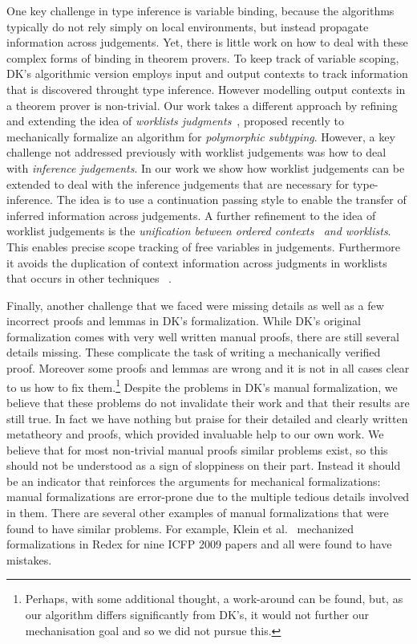 One key challenge in type inference is variable binding, because the
algorithms typically do not rely simply on local environments, but
instead propagate information across judgements.  Yet, there is little
work on how to deal with these complex forms of binding in theorem
provers. To keep track of variable scoping, DK's algorithmic version
employs input and output contexts to track information that is
discovered throught type inference. However modelling output contexts
in a theorem prover is non-trivial. Our work takes a different
approach by refining and extending the idea of \emph{worklists
  judgments}~\cite{itp2018}, proposed recently to mechanically formalize an
algorithm for \emph{polymorphic subtyping}.  However, a key challenge
not addressed previously with worklist judgements was how to deal with
\emph{inference judgements}.  In our work we show how worklist
judgements can be extended to deal with the inference judgements that
are necessary for type-inference.  The idea is to use a continuation
passing style to enable the transfer of inferred information across
judgements. A further refinement to the idea of worklist judgements is
the \emph{unification between ordered contexts~\cite{gundry2010type,dunfield2013complete}
 and
  worklists}.
This enables precise scope tracking of free variables in
judgements. Furthermore it avoids the duplication of context
information across judgments in worklists that occurs in other
techniques~\cite{Reed2009,Abel2011higher}
.

Finally, another challenge that we faced were missing details as well as
a few incorrect proofs and lemmas in DK's formalization. While DK's
original formalization comes with very well written manual proofs,
there are still several details missing. These complicate the task of
writing a mechanically verified proof. Moreover some proofs and
lemmas are wrong and it is not in all cases clear to us how to fix them.\footnote{
Perhaps, with some additional thought, a work-around can be found, but, as our algorithm
differs significantly from DK's, it would not further our mechanisation goal and so we did not pursue this.}
Despite the problems in DK's manual formalization,
we believe that these problems do not
invalidate their work and that their results are still true. In fact we have nothing but praise for their detailed
and clearly written metatheory and proofs, which provided invaluable
help to our own work.
We believe that for most non-trivial manual
proofs similar problems exist, so this should not be understood as a sign of sloppiness
on their part. Instead it should be an indicator that reinforces the arguments
for mechanical formalizations: manual formalizations are error-prone due to the multiple
tedious details involved in them.
There are several other examples of manual formalizations that were found to have
similar problems. For example, Klein et al.~\cite{KleinRunYourResearch}
 mechanized formalizations
in Redex for nine ICFP 2009 papers and all were found to have mistakes.

